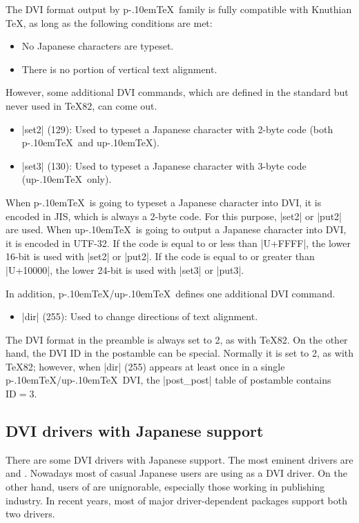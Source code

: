 \documentclass[a4paper,11pt,dvipdfmx]{article}
\let\emph=\origemph
\def\pTeX{p\kern-.10em\TeX}\def\upTeX{u\pTeX}
\begin{document}
The DVI format output by \pTeX\ family is fully compatible with
Knuthian \TeX, as long as the following conditions are met:
\begin{itemize}
  \item No Japanese characters are typeset.
  \item There is no portion of vertical text alignment.
\end{itemize}

However, some additional DVI commands, which are defined in the
standard \cite{dvistd0} but never used in \TeX82, can come out.
\begin{itemize}
  \item |set2| (129): %
    Used to typeset a Japanese character with 2-byte code
    (both \pTeX\ and \upTeX).
  \item |set3| (130): %
    Used to typeset a Japanese character with 3-byte code
    (\upTeX\ only).
\end{itemize}
When \pTeX\ is going to typeset a Japanese character into DVI,
it is encoded in JIS, which is always a 2-byte code.
For this purpose, |set2| or |put2| are used.
When \upTeX\ is going to output a Japanese character into DVI,
it is encoded in UTF-32.
If the code is equal to or less than |U+FFFF|,
the lower 16-bit is used with |set2| or |put2|.
If the code is equal to or greater than |U+10000|,
the lower 24-bit is used with |set3| or |put3|.

In addition, \pTeX/\upTeX\ defines one additional DVI command.
\begin{itemize}
  \item |dir| (255):
    Used to change directions of text alignment.
\end{itemize}
The DVI format in the preamble is always set to 2, as with \TeX82.
On the other hand, the DVI ID in the postamble can be special.
Normally it is set to 2, as with \TeX82; however,
when |dir| (255) appears at least once in a single \pTeX/\upTeX\ DVI,
the |post_post| table of postamble contains $\mathrm{ID} = 3$.

\subsection{DVI drivers with Japanese support}

There are some DVI drivers with Japanese support.
The most eminent drivers are \emph{dvips} and \emph{dvipdfmx}.
Nowadays most of casual Japanese users are using \emph{dvipdfmx} as a DVI driver.
On the other hand, users of \emph{dvips} are unignorable, especially those
working in publishing industry.
In recent years, most of major driver-dependent packages support
both two drivers.
\end{document}

